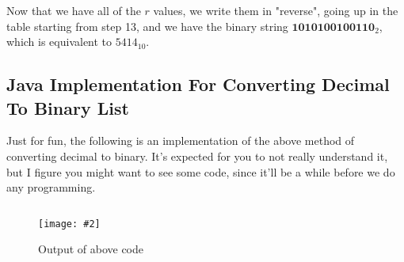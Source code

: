 \documentclass[11pt]{article}
\newcommand{\InsertGraph}[3]{
    \begin{figure}[h]
        \centering
        \texttt{[image: \#2]}
        \caption{{#3}}
        \label{Figure}
    \end{figure}
}
\begin{document}
Now that we have all of the $r$ values, we write them in "reverse", going up in the table starting from step 13, and we have the binary string $\textbf{1010100100110}_2$, which is equivalent to $5414_{10}$.

\newpage
\subsection{Java Implementation For Converting Decimal To Binary List}
Just for fun, the following is an implementation of the above method of converting decimal to binary.
It's expected for you to not really understand it, but I figure you might want to see some code, since it'll be a while before we do any programming.
\begin{listing}[H]
    \inputminted[bgcolor=LightGray, linenos, frame=single]{java}{code/Main.java}
\end{listing}
\InsertGraph{1}{img/output.png}{Output of above code}
\end{document}
